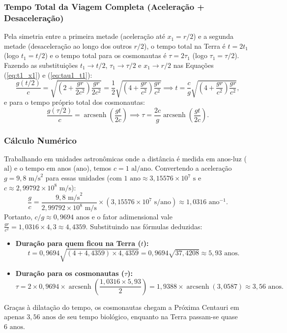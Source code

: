 \documentclass[11pt, a4paper]{article}
\begin{document}
\subsubsection{Tempo Total da Viagem Completa (Aceleração + Desaceleração)}
Pela simetria entre a primeira metade (aceleração até $x_1 = r/2$) e a segunda metade (desaceleração ao longo dos outros $r/2$), o tempo total na Terra é $t = 2 t_1$ (logo $t_1 = t/2$) e o tempo total para os cosmonautas é $\tau = 2 \tau_1$ (logo $\tau_1 = \tau/2$). Fazendo as substituições $t_1 \to t/2$, $\tau_1 \to \tau/2$ e $x_1 \to r/2$ nas Equações (\ref{eq:t1_x1}) e (\ref{eq:tau1_t1}):
\begin{equation}
\frac{g (t/2)}{c} = \sqrt{\left( 2 + \frac{g r}{2 c^2} \right) \frac{g r}{2 c^2}} = \frac{1}{2} \sqrt{\left( 4 + \frac{g r}{c^2} \right) \frac{g r}{c^2}} \implies t = \frac{c}{g} \sqrt{\left( 4 + \frac{g r}{c^2} \right) \frac{g r}{c^2}},
\end{equation}
e para o tempo próprio total dos cosmonautas:
\begin{equation}
\frac{g (\tau/2)}{c} = \operatorname{arcsenh}\left(\frac{g t}{2 c}\right) \implies \tau = \frac{2c}{g} \operatorname{arcsenh}\left(\frac{g t}{2 c}\right).
\end{equation}

\subsubsection{Cálculo Numérico}
Trabalhando em unidades astronômicas onde a distância é medida em anos-luz ($\text{al}$) e o tempo em anos ($\text{ano}$), temos $c = 1\text{ al/ano}$. Convertendo a aceleração $g = 9{,}8\text{ m/s}^2$ para essas unidades (com $1\text{ ano} \approx 3{,}15576 \times 10^7\text{ s}$ e $c \approx 2{,}99792 \times 10^8\text{ m/s}$):
\begin{equation}
\frac{g}{c} = \frac{9{,}8\text{ m/s}^2}{2{,}99792 \times 10^8\text{ m/s}} \times (3{,}15576 \times 10^7\text{ s/ano}) \approx 1{,}0316\text{ ano}^{-1}.
\end{equation}
Portanto, $c/g \approx 0{,}9694\text{ anos}$ e o fator adimensional vale $\frac{g r}{c^2} = 1{,}0316 \times 4{,}3 \approx 4{,}4359$. Substituindo nas fórmulas deduzidas:
\begin{itemize}
    \item \textbf{Duração para quem ficou na Terra ($t$):}
    \begin{equation}
    t = 0{,}9694 \sqrt{(4 + 4{,}4359) \times 4{,}4359} = 0{,}9694 \sqrt{37{,}4208} \approx 5{,}93\text{ anos}.
    \end{equation}
    \item \textbf{Duração para os cosmonautas ($\tau$):}
    \begin{equation}
    \tau = 2 \times 0{,}9694 \times \operatorname{arcsenh}\left(\frac{1{,}0316 \times 5{,}93}{2}\right) = 1{,}9388 \times \operatorname{arcsenh}(3{,}0587) \approx 3{,}56\text{ anos}.
    \end{equation}
\end{itemize}
Graças à dilatação do tempo, os cosmonautas chegam a Próxima Centauri em apenas $3{,}56\text{ anos}$ de seu tempo biológico, enquanto na Terra passam-se quase $6\text{ anos}$.
\end{document}
